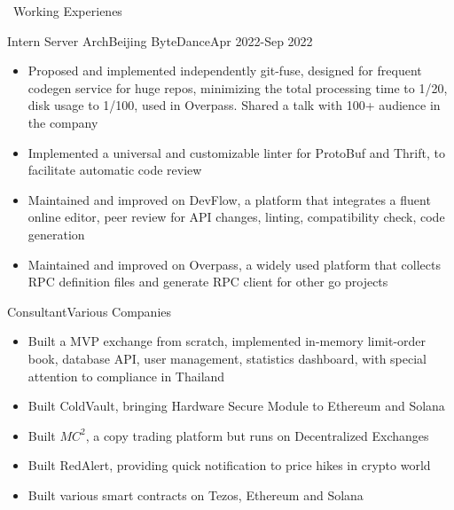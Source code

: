 \documentclass{resume}
\begin{document}
\begin{rSection}{\faUsers~Working Experienes}
    \begin{rExperience}{Intern Server Arch}{Beijing ByteDance}{Apr 2022-Sep 2022}
        \begin{itemize}
            \itemsep -0.5em \vspace{-0.5em}
            \item Proposed and implemented independently git-fuse, designed for frequent codegen service for huge repos, minimizing the total processing time to 1/20, disk usage to 1/100, used in Overpass. Shared a talk with 100+ audience in the company
            \item Implemented a universal and customizable linter for ProtoBuf and Thrift, to facilitate automatic code review
            \item Maintained and improved on DevFlow, a platform that integrates a fluent online editor, peer review for API changes, linting, compatibility check, code generation
            \item Maintained and improved on Overpass, a widely used platform that collects RPC definition files and generate RPC client for other go projects
        \end{itemize}
    \end{rExperience}
    \begin{rExperience}{Consultant}{Various Companies}{~}
        \begin{itemize}
            \itemsep -0.5em \vspace{-0.5em}
            \item Built a MVP exchange from scratch, implemented in-memory limit-order book, database API, user management, statistics dashboard, with special attention to compliance in Thailand
            \item Built ColdVault, bringing Hardware Secure Module to Ethereum and Solana
            \item Built $MC^{2}$, a copy trading platform but runs on Decentralized Exchanges
            \item Built RedAlert, providing quick notification to price hikes in crypto world
            \item Built various smart contracts on Tezos, Ethereum and Solana
        \end{itemize}
    \end{rExperience}
    

\end{rSection}
\end{document}
